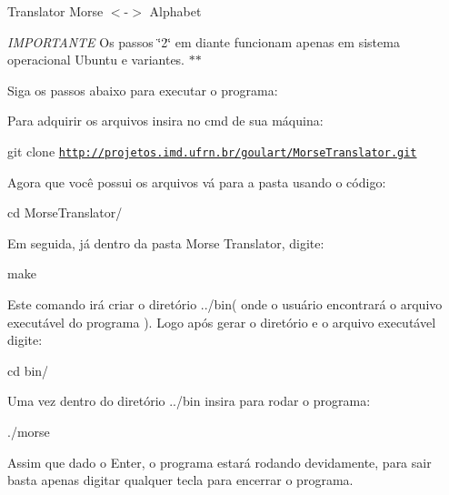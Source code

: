 Translator Morse $<$-\/$>$ Alphabet

{\itshape I\-M\-P\-O\-R\-T\-A\-N\-T\-E} Os passos \char`\"{}2\char`\"{} em diante funcionam apenas em sistema operacional Ubuntu e variantes. $\ast$$\ast$

Siga os passos abaixo para executar o programa\-:


\begin{DoxyEnumerate}
\item Para adquirir os arquivos insira no cmd de sua máquina\-:

git clone \href{http://projetos.imd.ufrn.br/goulart/MorseTranslator.git}{\tt http\-://projetos.\-imd.\-ufrn.\-br/goulart/\-Morse\-Translator.\-git}
\item Agora que você possui os arquivos vá para a pasta usando o código\-:

cd Morse\-Translator/
\item Em seguida, já dentro da pasta Morse Translator, digite\-:

make
\item Este comando irá criar o diretório ../bin( onde o usuário encontrará o arquivo executável do programa ). Logo após gerar o diretório e o arquivo executável digite\-: \begin{DoxyVerb}cd bin/
\end{DoxyVerb}

\item Uma vez dentro do diretório ../bin insira para rodar o programa\-:

./morse
\end{DoxyEnumerate}

Assim que dado o Enter, o programa estará rodando devidamente, para sair basta apenas digitar qualquer tecla para encerrar o programa. 
